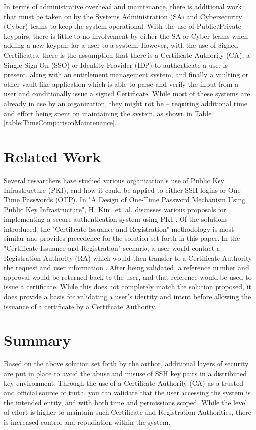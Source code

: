 \documentclass[conference]{IEEEtran}
\begin{document}
In terms of administrative overhead and maintenance, there is additional work that must be taken on by the Systems Administration (SA) and Cybersecurity (Cyber) teams to keep the system operational. With the use of Public/Private keypairs, there is little to no involvement by either the SA or Cyber teams when adding a new keypair for a user to a system. However, with the use of Signed Certificates, there is the assumption that there is a Certificate Authority (CA), a Single Sign On (SSO) or Identity Provider (IDP) to authenticate a user is present, along with an entitlement management system, and finally a vaulting or other vault like application which is able to parse and verify the input from a user and conditionally issue a signed Certificate. While most of these systems are already in use by an organization, they might not be -- requiring additional time and effort being spent on maintaining the system, as shown in Table \ref{table:TimeComparisonMaintenance}. 

\section{Related Work}
Several researchers have studied various organization's use of Public Key Infrastructure (PKI), and how it could be applied to either SSH logins or One Time Passwords (OTP). In "A Design of One-Time Password Mechanism Using Public Key Infrastructure", H. Kim, et. al. discusses various proposals for implementing a secure authentication system using PKI \cite{kim}. Of the solutions introduced, the "Certificate Issuance and Registration" methodology is most similar and provides precedence for the solution set forth in this paper. In the "Certificate Issuance and Registration" scenario, a user would contact a Registration Authority (RA) which would then transfer to a Certificate Authority the request and user information \cite{kim}. After being validated, a reference number and approval would be returned back to the user, and that reference would be used to issue a certificate. While this does not completely match the solution proposed, it does provide a basis for validating a user's identity and intent before allowing the issuance of a certificate by a Certificate Authority.

\section{Summary}
Based on the above solution set forth by the author, additional layers of security are put in place to avoid the abuse and misuse of SSH key pairs in a distributed key environment. Through the use of a Certificate Authority (CA) as a trusted and official source of truth, you can validate that the user accessing the system is the intended entity, and with both time and permissions scoped. While the level of effort is higher to maintain such Certificate and Registration Authorities, there is increased control and repudiation within the system.
\end{document}
